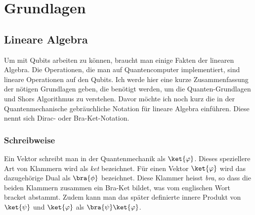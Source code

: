 \chapter{Grundlagen}
\section{Lineare Algebra}
Um mit Qubits arbeiten zu können, braucht man einige Fakten der linearen Algebra. Die Operationen, die man auf Quantencomputer implementiert, sind lineare Operationen auf den Qubits. Ich werde hier eine kurze Zusammenfassung der nötigen Grundlagen geben, die benötigt werden, um die Quanten-Grundlagen und Shors Algorithmus zu verstehen. Davor möchte ich noch kurz die in der Quantenmechanische gebräuchliche Notation für lineare Algebra einführen. Diese nennt sich Dirac- oder Bra-Ket-Notation. 

\subsection{Schreibweise}
Ein Vektor schreibt man in der Quantenmechanik als $\ket{\varphi}$. Dieses speziellere Art von Klammern wird als \textit{ket} bezeichnet. Für einen Vektor $\ket{\varphi}$ wird das dazugehörige Dual als $\bra{\phi}$ bezeichnet. Diese Klammer heisst \textit{bra}, so dass die beiden Klammern zusammen ein Bra-Ket bildet, was vom englischen Wort bracket abstammt. Zudem kann man das später definierte innere Produkt von $\ket{\psi}$ und $\ket{\varphi}$ als $\bra{\psi}\ket{\varphi}$.

